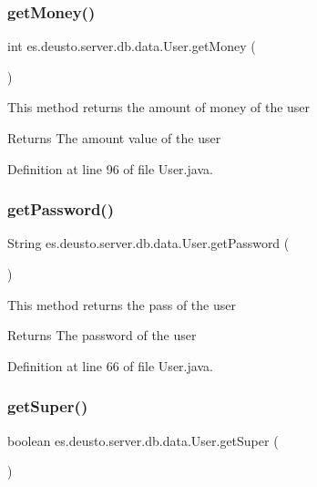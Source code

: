 \subsubsection{\texorpdfstring{get\+Money()}{getMoney()}}
{\footnotesize\ttfamily int es.\+deusto.\+server.\+db.\+data.\+User.\+get\+Money (\begin{DoxyParamCaption}{ }\end{DoxyParamCaption})}

This method returns the amount of money of the user \begin{DoxyReturn}{Returns}
The amount value of the user 
\end{DoxyReturn}


Definition at line 96 of file User.\+java.

\mbox{\label{classes_1_1deusto_1_1server_1_1db_1_1data_1_1_user_ac576607b3eae9e9b8c7002d5cd7c1a62}} 
\subsubsection{\texorpdfstring{get\+Password()}{getPassword()}}
{\footnotesize\ttfamily String es.\+deusto.\+server.\+db.\+data.\+User.\+get\+Password (\begin{DoxyParamCaption}{ }\end{DoxyParamCaption})}

This method returns the pass of the user \begin{DoxyReturn}{Returns}
The password of the user 
\end{DoxyReturn}


Definition at line 66 of file User.\+java.

\mbox{\label{classes_1_1deusto_1_1server_1_1db_1_1data_1_1_user_a9f13d80d62b561e4fc76286cccf3333a}} 
\subsubsection{\texorpdfstring{get\+Super()}{getSuper()}}
{\footnotesize\ttfamily boolean es.\+deusto.\+server.\+db.\+data.\+User.\+get\+Super (\begin{DoxyParamCaption}{ }\end{DoxyParamCaption})}

